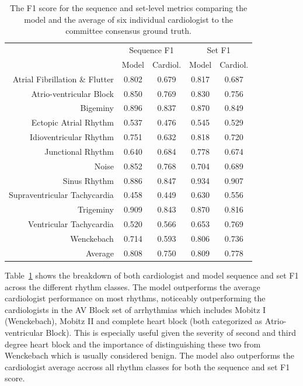 \begin{table}
\centering
\begin{small}
\begin{tabular}{r c c c c}
\toprule
    & \multicolumn{2}{c}{Sequence F1} & \multicolumn{2}{c}{Set F1} \\
\cmidrule{2-5}
 & Model & Cardiol. & Model & Cardiol. \\
\midrule
Atrial Fibrillation \& Flutter & 0.802 & 0.679 & 0.817 & 0.687 \\
Atrio-ventricular Block        & 0.850 & 0.769 & 0.830 & 0.756 \\
Bigeminy                       & 0.896 & 0.837 & 0.870 & 0.849 \\
Ectopic Atrial Rhythm          & 0.537 & 0.476 & 0.545 & 0.529 \\
Idioventricular Rhythm         & 0.751 & 0.632 & 0.818 & 0.720 \\
Junctional Rhythm              & 0.640 & 0.684 & 0.778 & 0.674 \\
Noise                          & 0.852 & 0.768 & 0.704 & 0.689 \\
Sinus Rhythm                   & 0.886 & 0.847 & 0.934 & 0.907 \\
Supraventricular Tachycardia   & 0.458 & 0.449 & 0.630 & 0.556 \\
Trigeminy                      & 0.909 & 0.843 & 0.870 & 0.816 \\
Ventricular Tachycardia        & 0.520 & 0.566 & 0.653 & 0.769 \\
Wenckebach                     & 0.714 & 0.593 & 0.806 & 0.736 \\
\midrule
Average	                       & 0.808 & 0.750 & 0.809 & 0.778 \\
\bottomrule
\end{tabular}
\end{small}
\caption{The F1 score for the sequence and set-level metrics comparing the
         model and the average of six individual cardiologist to the committee
         consensus ground truth.}
\label{tab:arrhythmias:model_cardiologist_f1}
\end{table}

Table~\ref{tab:arrhythmias:model_cardiologist_f1} shows the breakdown of both
cardiologist and model sequence and set F1 across the different rhythm classes.
The model outperforms the average cardiologist performance on most rhythms,
noticeably outperforming the cardiologists in the AV Block set of arrhythmias
which includes Mobitz I (Wenckebach), Mobitz II and complete heart block (both
categorized as Atrio-ventricular Block). This is especially useful given the
severity of second and third degree heart block and the importance of
distinguishing these two from Wenckebach which is usually considered benign.
The model also outperforms the cardiologist average accross all rhythm classes
for both the sequence and set F1 score.

